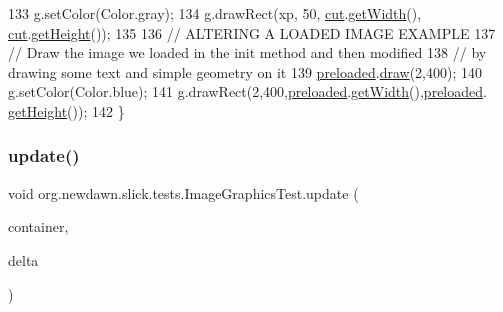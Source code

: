 \begin{DoxyCode}
133         g.setColor(Color.gray);
134         g.drawRect(xp, 50, \mbox{\hyperlink{classorg_1_1newdawn_1_1slick_1_1tests_1_1_image_graphics_test_a2fa20a20e1c0e9f83c27c498e2cb8b23}{cut}}.\mbox{\hyperlink{classorg_1_1newdawn_1_1slick_1_1_image_a94a5d32276e8a27930480223c5d69e11}{getWidth}}(), \mbox{\hyperlink{classorg_1_1newdawn_1_1slick_1_1tests_1_1_image_graphics_test_a2fa20a20e1c0e9f83c27c498e2cb8b23}{cut}}.\mbox{\hyperlink{classorg_1_1newdawn_1_1slick_1_1_image_aa2594a93f5126f60ad8a72444fceee98}{getHeight}}());
135         
136         \textcolor{comment}{// ALTERING A LOADED IMAGE EXAMPLE}
137         \textcolor{comment}{// Draw the image we loaded in the init method and then modified}
138         \textcolor{comment}{// by drawing some text and simple geometry on it}
139         \mbox{\hyperlink{classorg_1_1newdawn_1_1slick_1_1tests_1_1_image_graphics_test_a60866f2682da296b8acce663a9234490}{preloaded}}.\mbox{\hyperlink{classorg_1_1newdawn_1_1slick_1_1_image_a9bddcca05c7140ab45df8ac5b250b6cd}{draw}}(2,400);
140         g.setColor(Color.blue);
141         g.drawRect(2,400,\mbox{\hyperlink{classorg_1_1newdawn_1_1slick_1_1tests_1_1_image_graphics_test_a60866f2682da296b8acce663a9234490}{preloaded}}.\mbox{\hyperlink{classorg_1_1newdawn_1_1slick_1_1_image_a94a5d32276e8a27930480223c5d69e11}{getWidth}}(),\mbox{\hyperlink{classorg_1_1newdawn_1_1slick_1_1tests_1_1_image_graphics_test_a60866f2682da296b8acce663a9234490}{preloaded}}.
      \mbox{\hyperlink{classorg_1_1newdawn_1_1slick_1_1_image_aa2594a93f5126f60ad8a72444fceee98}{getHeight}}());
142     \}
\end{DoxyCode}
\mbox{\label{classorg_1_1newdawn_1_1slick_1_1tests_1_1_image_graphics_test_ab7435a4e85465d647a719bc1768bfa0e}} 
\subsubsection{\texorpdfstring{update()}{update()}}
{\footnotesize\ttfamily void org.\+newdawn.\+slick.\+tests.\+Image\+Graphics\+Test.\+update (\begin{DoxyParamCaption}\item[{\mbox{\hyperlink{classorg_1_1newdawn_1_1slick_1_1_game_container}{Game\+Container}}}]{container,  }\item[{int}]{delta }\end{DoxyParamCaption})\hspace{0.3cm}{\ttfamily [inline]}}


